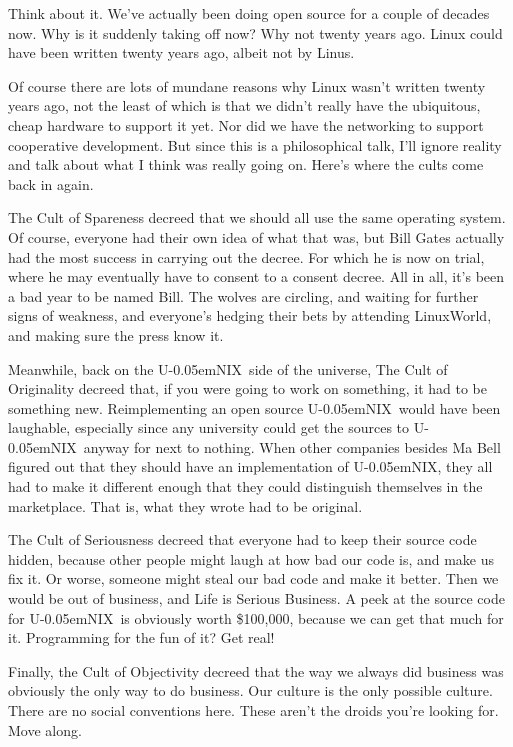 \documentclass[10pt,letterpaper]{article}
\newcommand{\unix}{{\small U\kern-0.05emNIX\spacefactor1000}}
\begin{document}
Think about it. We've actually been doing open source for a couple of decades
now. Why is it suddenly taking off now? Why not twenty years ago. Linux could
have been written twenty years ago, albeit not by Linus.

Of course there are lots of mundane reasons why Linux wasn't written twenty
years ago, not the least of which is that we didn't really have the
ubiquitous, cheap hardware to support it yet. Nor did we have the networking
to support cooperative development. But since this is a philosophical talk,
I'll ignore reality and talk about what I think was really going on. Here's
where the cults come back in again.

The Cult of Spareness decreed that we should all use the same operating
system. Of course, everyone had their own idea of what that was, but Bill
Gates actually had the most success in carrying out the decree. For which he
is now on trial, where he may eventually have to consent to a consent decree.
All in all, it's been a bad year to be named Bill. The wolves are circling,
and waiting for further signs of weakness, and everyone's hedging their bets
by attending LinuxWorld, and making sure the press know it.

Meanwhile, back on the \unix\ side of the universe, The Cult of Originality
decreed that, if you were going to work on something, it had to be something
new. Reimplementing an open source \unix\ would have been laughable, especially
since any university could get the sources to \unix\ anyway for next to
nothing. When other companies besides Ma Bell figured out that they should
have an implementation of \unix, they all had to make it different enough that
they could distinguish themselves in the marketplace. That is, what they
wrote had to be original.

The Cult of Seriousness decreed that everyone had to keep their source code
hidden, because other people might laugh at how bad our code is, and make us
fix it. Or worse, someone might steal our bad code and make it better. Then
we would be out of business, and Life is Serious Business. A peek at the
source code for \unix\ is obviously worth \$100,000, because we can get that
much for it. Programming for the fun of it? Get real!

Finally, the Cult of Objectivity decreed that the way we always did business
was obviously the only way to do business. Our culture is the only possible
culture. There are no social conventions here. These aren't the droids you're
looking for. Move along.
\end{document}
